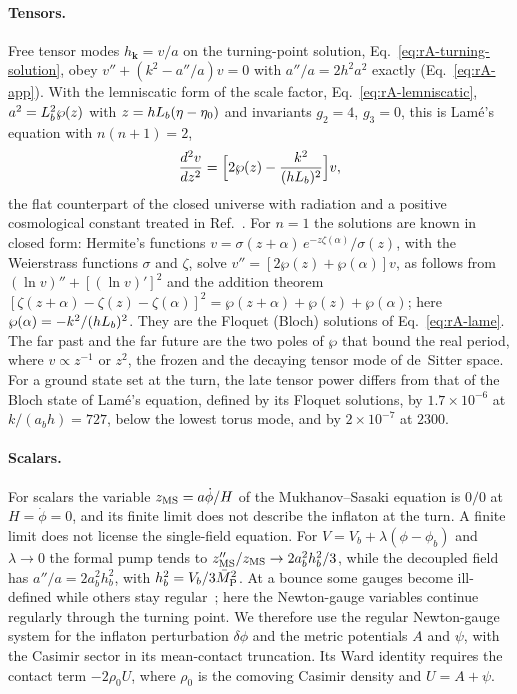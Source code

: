 \paragraph{Tensors.}
Free tensor modes $h_{\bm k}=v/a$ on the turning-point solution, Eq.~\eqref{eq:rA-turning-solution}, obey $v''+(k^2-a''/a)v=0$ with $a''/a=2h^2a^2$ exactly (Eq.~\eqref{eq:rA-app}).
With the lemniscatic form of the scale factor, Eq.~\eqref{eq:rA-lemniscatic}, $a^2=L_b^2\wp(z)$ with $z=hL_b(\eta-\eta_0)$ and invariants $g_2=4$, $g_3=0$, this is Lam\'e's equation with $n(n+1)=2$,
\begin{equation}
\frac{d^2v}{dz^2}=\Big[2\wp(z)-\frac{k^2}{(hL_b)^2}\Big]v ,
\label{eq:rA-lame}
\end{equation}
the flat counterpart of the closed universe with radiation and a positive cosmological constant treated in Ref.~\cite{Sarangi:2006yy}.
For $n=1$ the solutions are known in closed form: Hermite's functions $v=\sigma(z+\alpha)\,e^{-z\zeta(\alpha)}/\sigma(z)$, with the Weierstrass functions $\sigma$ and $\zeta$, solve $v''=[2\wp(z)+\wp(\alpha)]v$, as follows from $(\ln v)''+[(\ln v)']^2$ and the addition theorem $[\zeta(z+\alpha)-\zeta(z)-\zeta(\alpha)]^2=\wp(z+\alpha)+\wp(z)+\wp(\alpha)$; here $\wp(\alpha)=-k^2/(hL_b)^2$.
They are the Floquet (Bloch) solutions of Eq.~\eqref{eq:rA-lame}.
The far past and the far future are the two poles of $\wp$ that bound the real period, where $v\propto z^{-1}$ or $z^2$, the frozen and the decaying tensor mode of de~Sitter space.
For a ground state set at the turn, the late tensor power differs from that of the Bloch state of Lam\'e's equation, defined by its Floquet solutions, by $1.7\times10^{-6}$ at $k/(a_bh)=727$, below the lowest torus mode, and by $2\times10^{-7}$ at $2300$. %

\paragraph{Scalars.}
For scalars the variable $z_{\rm MS}=a\dot\phi/H$ of the Mukhanov--Sasaki equation is $0/0$ at $H=\dot\phi=0$, and its finite limit does not describe the inflaton at the turn.
A finite limit does not license the single-field equation.
For $V=V_b+\lambda(\phi-\phi_b)$ and $\lambda\to0$ the formal pump tends to $z_{\rm MS}''/z_{\rm MS}\to2a_b^2h_b^2/3$, while the decoupled field has $a''/a=2a_b^2h_b^2$, with $h_b^2=V_b/3\bar M_{\mathrm{P}}^2$. %
At a bounce some gauges become ill-defined while others stay regular~\cite{Allen:2004vz}; here the Newton-gauge variables continue regularly through the turning point.
We therefore use the regular Newton-gauge system for the inflaton perturbation $\delta\phi$ and the metric potentials $A$ and $\psi$, with the Casimir sector in its mean-contact truncation.
Its Ward identity requires the contact term $-2\rho_0U$, where $\rho_0$ is the comoving Casimir density and $U=A+\psi$.

